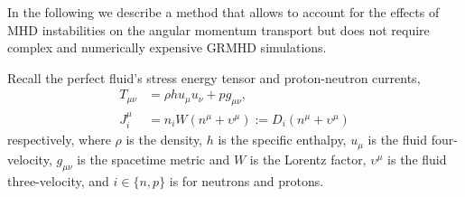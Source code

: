 In the following we describe a method that allows to account for the effects of \ac{MHD} 
instabilities on the angular momentum transport but does not require complex and numerically 
expensive \ac{GRMHD} simulations. 
%
%
%
%
%
%
%
%
%
%

Recall the perfect fluid's stress energy tensor and proton-neutron currents, 
%
\begin{subequations}
    \begin{align}
    T_{\mu\nu} &= \rho h u_{\mu} u_{\nu} + pg_{\mu\nu}, \\
    J^{\mu}_i &= n_i W(n^{\mu} + \upsilon^{\mu}) := D_i (n^{\mu} + \upsilon^{\mu})
    \end{align}
\end{subequations}
% 
respectively, where $\rho$ is the density, $h$ is the specific enthalpy, 
$u_{\mu}$ is the fluid four-velocity, $g_{\mu\nu}$ is the spacetime metric and 
$W$ is the Lorentz factor, $\upsilon^{\mu}$ is the fluid three-velocity,
and $i\in\{n,p\}$ is for neutrons and protons.

